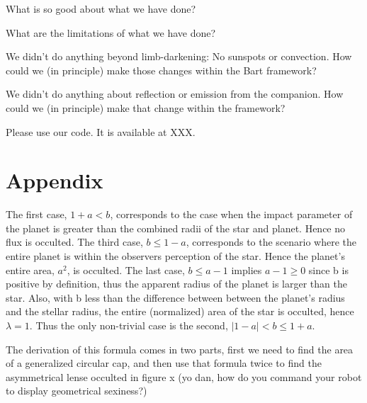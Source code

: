 \documentclass[12pt,preprint]{aastex}
\newcommand{\project}[1]{{\sffamily #1}}
\begin{document}
What is so good about what we have done?

What are the limitations of what we have done?

We didn't do anything beyond limb-darkening:  No sunspots or convection.
How could we (in principle) make those changes within the \project{Bart} framework?

We didn't do anything about reflection or emission from the companion.
How could we (in principle) make that change within the framework?

Please use our code.  It is available at XXX.

\acknowledgments

\section{Appendix}

The first case, $1+a < b$, corresponds to the case when the impact parameter of the planet is greater than the combined radii of the star and planet. Hence no flux is occulted.  The third case, $b \leq 1-a$, corresponds to the scenario where the entire planet is within the observers perception of the star.  Hence the planet's entire area, $a^2$, is occulted.  The last case, $b \leq a-1$ implies $a-1 \geq 0$ since b is positive by definition, thus the apparent radius of the planet is larger than the star.  Also, with b less than the difference between between the planet's radius and the stellar radius, the entire (normalized) area of the star is occulted, hence $\lambda = 1$.  Thus the only non-trivial case is the second, $|1-a| < b \leq 1+a$.

The derivation of this formula comes in two parts, first we need to find the area of a generalized circular cap, and then use that formula twice to find the asymmetrical lense occulted in figure x (yo dan, how do you command your robot to display geometrical sexiness?)  

%
\end{document}
